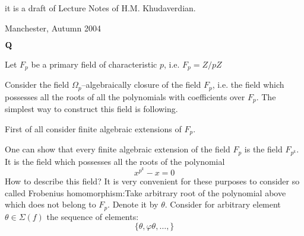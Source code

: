 
\def\A {\bf A}
\def\t {\tilde}
\def\a {\alpha}
\def\K {{\bf K}}
\def\N {{\bf N}}
\def\V {{\cal V}}
\def\s {{\sigma}}
\def\S {{\Sigma}}
\def\s {{\sigma}}
\def\vare{{\varepsilon}}
\def\Q {{\bf Q}}
\def\D {{\cal D}}
\def\G {{\Gamma}}
\def\C {{\bf C}}
\def\M {{\cal M}}
\def\Z {{\bf Z}}
\def\U  {{\cal U}}
\def\H {{\cal H}}
\def\R  {{\bf R}}
\def\l {\lambda}
\def\degree {{\bf {\rm degree}\,\,}}
\def \finish {${\,\,\vrule height1mm depth2mm width 8pt}$}
\def \m {\medskip}
\def\p {\partial}





%


  \centerline {it is a draft of Lecture Notes of H.M. Khudaverdian.}

  \centerline { Manchester, Autumn 2004}


$\Q$




\def\ansatz {substitution}



   Let $F_p$ be a primary field of characteristic  $p$, i.e. $F_p=Z/pZ$

Consider the field $\Omega_p$--algebraically closure of the field
$F_p$, i.e. the field which possesses all the roots of all the
polynomials with coefficients over $F_p$. The simplest way to
construct this field is following.

First of all consider finite algebraic extensions  of $F_p$.


  One can show that every finite algebraic extension of the field
  $F_p$ is the field $F_{p^k}$.
  It is the field which possesses all the roots of the polynomial
             $$
             x^{p^k}-x=0
             $$
How to describe this field?  It is very convenient for these
purposes to consider so called Frobenius homomorphism:Take
arbitrary root of the polynomial above which does not belong to
$F_p$. Denote it by $\theta$.
  Consider for arbitrary element $\theta\in \Sigma(f)$ the sequence of elements:
                  $$
             \{\theta,\varphi\theta,\dots,\}
                  $$

\bye
